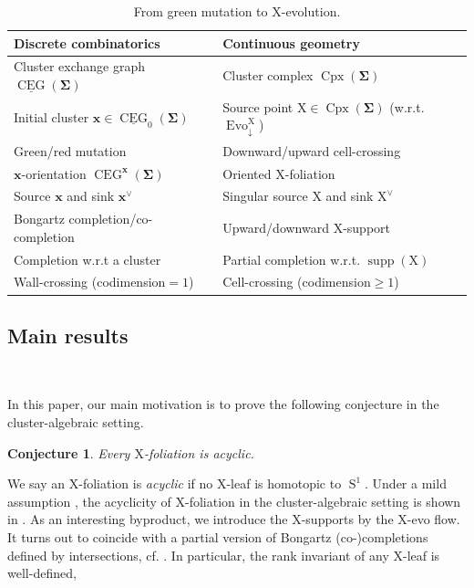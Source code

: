 \documentclass[11pt,reqno]{amsart}
\theoremstyle{plain}
\newtheorem{conjecture}[theorem]{Conjecture}
\theoremstyle{definition}
\numberwithin{equation}{section}
\newcommand\<{\langle}
\renewcommand\>{\rangle}
\newcommand{\CEG}{\operatorname{CEG}} %
\newcommand{\uCEG}{\underline{\CEG}} %
\newcommand{\on}[1]{\operatorname{#1}}
\def\CCx{\on{Cpx}}   %
\def\sphere{\on{S}}   %
\def\sink{X}
\newcommand{\flowD}[1]{\on{Evo}_{\downarrow}^{#1}}
\newcommand{\ccpt}[1]{\mathrm{#1}}%
\def\xevo{\ccpt{X}}%
\def\seeds{\mathbf{\Sigma}}
\def\xx{\mathbf{x}}%
\def\supp{\on{supp}}
\newcommand{\DT}[1]{#1^{\vee}}
\def\Xevo{\DT{\ccpt{X}}}
\begin{document}
\begin{table}[H]\label{table:D-vs-C}
\centering
\small
\renewcommand{\arraystretch}{1.2}
\begin{tabular}{@{}p{.45\linewidth}p{.49\linewidth}@{}}
\hline
\textbf{Discrete combinatorics} & \textbf{Continuous geometry}\\
\hline
Cluster exchange graph $\uCEG(\seeds)$
 & Cluster complex $\CCx(\seeds)$\\
Initial cluster $\xx\in\uCEG_0(\seeds)$
 & Source point $\xevo\in\CCx(\seeds)$ (w.r.t. $\flowD{\xevo}$)\\
Green/red mutation
 & Downward/upward cell-crossing\\
$\xx$-orientation $\CEG^{\xx}(\seeds)$
 & Oriented $\xevo$-foliation\\
Source $\xx$ and sink $\DT{\xx}$
 & Singular source $\xevo$ and sink $\Xevo$\\
Bongartz completion/co-completion
 & Upward/downward $\xevo$-support\\
Completion w.r.t a cluster
 & Partial completion w.r.t. $\supp(\xevo)$\\
Wall-crossing (codimension$=1$)
 & Cell-crossing (codimension$\ge1$)\\
 
\hline
\end{tabular}
\caption{From green mutation to $\xevo$-evolution.}
\label{table}
\end{table}

\subsection{Main results}\


In this paper, our main motivation is to prove the following conjecture in the cluster-algebraic setting.
\begin{conjecture}\cite[Conj.~1.7]{QT}\label{Conj0}
    Every $\xevo$-foliation is acyclic.
\end{conjecture}
We say an $\xevo$-foliation is \emph{acyclic} if no $\xevo$-leaf is homotopic to $\sphere^1$.
Under a mild assumption \Cref{ass0}, the acyclicity of $\xevo$-foliation in the cluster-algebraic setting is shown in .
As an interesting byproduct, we introduce the $\xevo$-supports by the $\xevo$-evo flow.
It turns out to coincide with a partial version of Bongartz (co-)completions defined by intersections, cf. .
In particular, the rank invariant of any $\xevo$-leaf is well-defined, 
\end{document}
